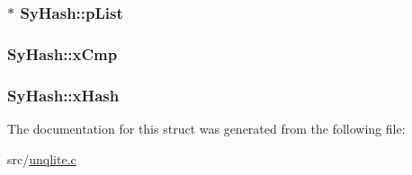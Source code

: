 \hypertarget{struct_sy_hash_a0b42c072a791617181baa82cb777bb0e}{
\subsubsection[{p\-List}]{$\ast$ Sy\-Hash\-::p\-List}}\label{d9/da7/struct_sy_hash_a0b42c072a791617181baa82cb777bb0e}
\hypertarget{struct_sy_hash_a0fa65eed4a46c8509041af970b881e90}{
\subsubsection[{x\-Cmp}]{ Sy\-Hash\-::x\-Cmp}}\label{d9/da7/struct_sy_hash_a0fa65eed4a46c8509041af970b881e90}
\hypertarget{struct_sy_hash_a7d93ecb0b817fbc658c0885cf76b4aaf}{
\subsubsection[{x\-Hash}]{ Sy\-Hash\-::x\-Hash}}\label{d9/da7/struct_sy_hash_a7d93ecb0b817fbc658c0885cf76b4aaf}


The documentation for this struct was generated from the following file\-:\begin{DoxyCompactItemize}
\item 
src/\hyperlink{unqlite_8c}{unqlite.\-c}\end{DoxyCompactItemize}
